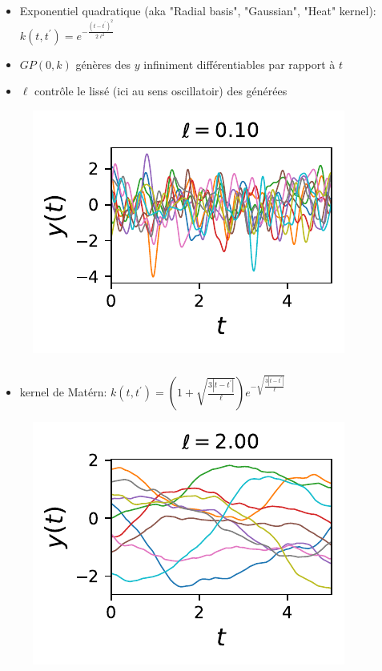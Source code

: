 \documentclass[xcolor=svgnames, t]{beamer}
\begin{document}
\begin{frame}
  \frametitle{\secname}
  
  \begin{itemize}
    \item Exponentiel quadratique (aka "Radial basis", "Gaussian", "Heat" kernel):
    $k (t, t^\prime) = e^{- \frac{(t - t^\prime)^2}{2 \ell^2} }$
    \item $GP (0, k)$ génères des $y$ infiniment différentiables par rapport à $t$
    \item \implies $\ell$ contrôle le lissé (ici au sens oscillatoir) des générées
  \end{itemize}
  \begin{figure}
    \includegraphics{10_gp_time_SquaredExponentialKernel_0.10.pdf}
  \end{figure}
\end{frame}

\begin{frame}
  \frametitle{\secname}
  
  \begin{itemize}
    \item kernel de Matérn:
    $k (t, t^\prime) = ( 1 + \sqrt{\frac{3 |t - t^\prime|}{\ell} } ) e^{-\sqrt{\frac{3 |t - t^\prime|}{\ell} }}$
  \end{itemize}
  \begin{figure}
    \includegraphics{10_gp_time_MaternKernel_2.00.pdf}
  \end{figure}
\end{frame}
\end{document}
